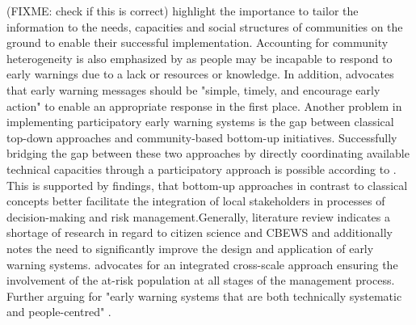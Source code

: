 {(FIXME: check if this is correct)\autocite{gladfelterPoliticsParticipationCommunitybased2018,inayathEARLYWARNINGSYSTEM2018,trogrlicIndigenousKnowledgeEarly2018} highlight the importance to tailor the information to the needs, capacities and social structures of communities on the ground to enable their successful implementation. Accounting for community heterogeneity is also emphasized by \autocite{gladfelterPoliticsParticipationCommunitybased2018} as people may be incapable to respond to early warnings due to a lack or resources or knowledge. In addition, \autocite[21]{inayathEARLYWARNINGSYSTEM2018} advocates that early warning messages should be "simple, timely, and encourage early action" to enable an appropriate response in the first place.
Another problem in implementing participatory early warning systems is the gap between classical top-down approaches and community-based bottom-up initiatives. Successfully bridging the gap between these two approaches by directly coordinating available technical capacities through a participatory approach is possible according to \autocite{tarchianiCommunityImpactBased2020}. This is supported by \autocite{henriksenParticipatoryEarlyWarning2018} findings, that bottom-up approaches in contrast to classical concepts better facilitate the integration of local stakeholders in processes of decision-making and risk management.Generally, \autocite{marcheziniReviewStudiesParticipatory2018} literature review indicates a shortage of research in regard to citizen science and CBEWS and \autocite{baudoinEarlyWarningSystems2014} additionally notes the need to significantly improve the design and application of early warning systems. \autocite{baudoinEarlyWarningSystems2014} advocates for an integrated cross-scale approach ensuring the involvement of the at-risk population at all stages of the management process. Further arguing for "early warning systems that are both technically systematic and people-centred" \autocite[15]{baudoinEarlyWarningSystems2014}.






}
